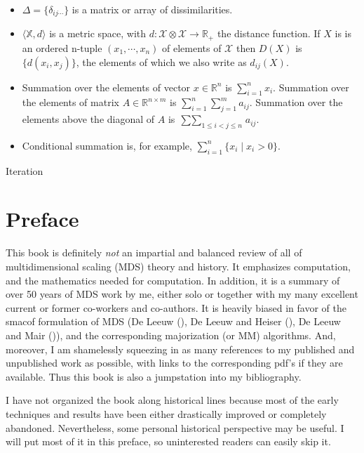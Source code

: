 \documentclass[
  12pt,
  letterpaper,
  DIV=11,
  numbers=noendperiod]{scrreprt}
\theoremstyle{remark}
\begin{document}
\begin{itemize}
\item
  \(\Delta=\{\delta_{ij\cdots}\}\) is a matrix or array of
  dissimilarities.
\item
  \(\langle \mathbb{X},d\rangle\) is a metric space, with
  \(d:\mathcal{X}\otimes\mathcal{X}\rightarrow\mathbb{R}_+\) the
  distance function. If \(X\) is is an ordered n-tuple
  \((x_1,\cdots,x_n)\) of elements of \(\mathcal{X}\) then \(D(X)\) is
  \(\{d(x_i,x_j)\}\), the elements of which we also write as
  \(d_{ij}(X)\).
\item
  Summation over the elements of vector \(x\in\mathbb{R}^n\) is
  \(\sum_{i=1}^n x_i\). Summation over the elements of matrix
  \(A\in\mathbb{R}^{n\times m}\) is \(\sum_{i=1}^n\sum_{j=1}^m a_{ij}\).
  Summation over the elements above the diagonal of \(A\) is
  \(\mathop{\sum\sum}_{1\leq i<j\leq n}a_{ij}\).
\item
  Conditional summation is, for example,
  \(\sum_{i=1}^n \{x_i\mid x_i>0\}\).
\end{itemize}

Iteration


\chapter*{Preface}\label{preface}


This book is definitely \emph{not} an impartial and balanced review of
all of multidimensional scaling (MDS) theory and history. It emphasizes
computation, and the mathematics needed for computation. In addition, it
is a summary of over 50 years of MDS work by me, either solo or together
with my many excellent current or former co-workers and co-authors. It
is heavily biased in favor of the smacof formulation of MDS (De Leeuw
(), De Leeuw and Heiser
(), De Leeuw and Mair
()), and the corresponding
majorization (or MM) algorithms. And, moreover, I am shamelessly
squeezing in as many references to my published and unpublished work as
possible, with links to the corresponding pdf's if they are available.
Thus this book is also a jumpstation into my bibliography.

I have not organized the book along historical lines because most of the
early techniques and results have been either drastically improved or
completely abandoned. Nevertheless, some personal historical perspective
may be useful. I will put most of it in this preface, so uninterested
readers can easily skip it.
\end{document}
